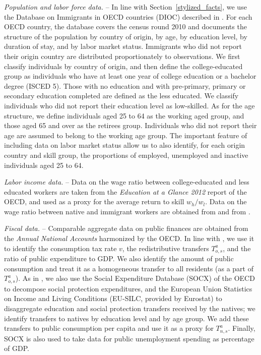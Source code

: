 \documentclass[a4paper,12pt]{article}
\begin{document}
\emph{Population and labor force data.} -- In  line  with  Section~\ref{stylized_facts},  we  use  the  Database  on  Immigrants in OECD countries (DIOC) described in \citet{Arslan2014}. For each OECD country, the database covers the census round 2010 and documents the structure of the population by country of origin, by age, by education level, by duration of stay, and by labor market status.  Immigrants who did not report their origin country are distributed proportionately to observations. We first classify individuals by country of origin, and then define the college-educated group as individuals who have at least one year of college education or a bachelor degree (ISCED 5).  Those with no education and with pre-primary, primary or secondary education completed are defined as the less educated. We classify individuals who did not report their education level
as low-skilled.  As for the age structure, we define individuals aged 25 to 64 as the working
aged group, and  those aged 65 and over as the retirees group. Individuals who did not report their age are assumed to belong to the working age group. The important feature of including data on labor market status allow us to also identify, for each origin country and skill group, the proportions of employed, unemployed and inactive individuals aged 25 to 64.

\emph{Labor income data.} -- Data on the wage ratio between college-educated and less educated workers are taken from the \textit{Education at a Glance 2012} report of the OECD, and used  as a proxy for the average return to skill $w_h/w_l$. Data on the wage ratio between native and immigrant workers are obtained from \citet{Buchel2005} and from \citet{Docquier2014}.

\emph{Fiscal data.} -- Comparable aggregate data on public finances are obtained from the \textit{Annual National Accounts} harmonized by the OECD. In line with \citet{Burzynski2018}, we use it to identify the consumption tax rate $v$, the redistributive transfers $T^a_{o,s}$, and the ratio of public expenditure to GDP. We  also  identify  the  amount  of  public  consumption  and  treat  it  as a  homogeneous  transfer  to  all  residents  (as  a  part  of $T^a_{o,s}$). As in \citet{Aubry2016},  we also use the Social Expenditure Database (SOCX) of the OECD to decompose social protection expenditures, and the European Union Statistics on Income and Living Conditions (EU-SILC, provided by Eurostat) to disaggregate education and social protection transfers received by the natives; we identify transfers to natives by education level and by age group. We add these transfers to public consumption per capita and  use  it  as  a  proxy  for $T^a_{n,s}$. Finally, SOCX is also used to take data for public unemployment spending as percentage of GDP.
\end{document}
